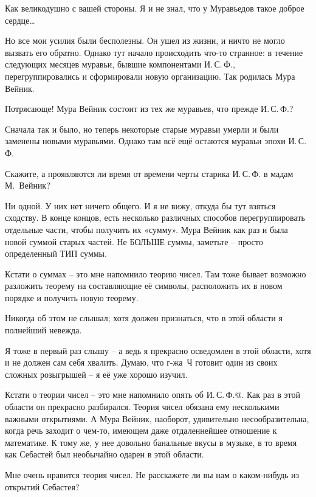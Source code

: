 \documentclass[../main.tex]{subfiles}
\begin{document}
\begin{dialogue}
 Как великодушно с вашей стороны. Я и не знал, что у Муравьедов такое доброе сердце\ldots{}

 Но все мои усилия были бесполезны. Он ушел из жизни, и ничто не могло вызвать его обратно. Однако тут начало происходить что-то странное: в течение следующих месяцев муравьи, бывшие компонентами И.\,С.\,Ф., перегруппировались и сформировали новую организацию. Так родилась Мура Вейник.

 Потрясающе! Мура Вейник состоит из тех же муравьев, что прежде И.\,С.\,Ф.?

 Сначала так и было, но теперь некоторые старые муравьи умерли и были заменены новыми муравьями. Однако там всё ещё остаются муравьи эпохи И.\,С.\,Ф.

 Скажите, а проявляются ли время от времени черты старика И.\,С.\,Ф. в мадам М.~Вейник?

 Ни одной. У них нет ничего общего. И я не вижу, откуда бы тут взяться сходству. В конце концов, есть несколько различных способов перегруппировать отдельные части, чтобы получить их «сумму». Мура Вейник как раз и была новой суммой старых частей. Не БОЛЬШЕ суммы, заметьте \--- просто определенный ТИП суммы.

 Кстати о суммах \--- это мне напомнило теорию чисел. Там тоже бывает возможно разложить теорему на составляющие её символы, расположить их в новом порядке и получить новую теорему.

 Никогда об этом не слышал; хотя должен признаться, что в этой области я полнейший невежда.

 Я тоже в первый раз слышу \--- а ведь я прекрасно осведомлен в этой области, хотя и не должен сам себя хвалить. Думаю, что г-жа~Ч готовит один из своих сложных розыгрышей \--- я её уже хорошо изучил.

 Кстати о теории чисел \--- это мне напомнило опять об И.\,С.\,Ф.@. Как раз в этой области он прекрасно разбирался. Теория чисел обязана ему несколькими важными открытиями. А Мура Вейник, наоборот, удивительно несообразительна, когда речь заходит о чем-то, имеющем даже отдаленнейшее отношение к математике. К тому же, у нее довольно банальные вкусы в музыке, в то время как Себастей был необычайно одарен в этой области.

 Мне очень нравится теория чисел. Не расскажете ли вы нам о каком-нибудь из открытий Себастея?


\end{dialogue}
\end{document}
